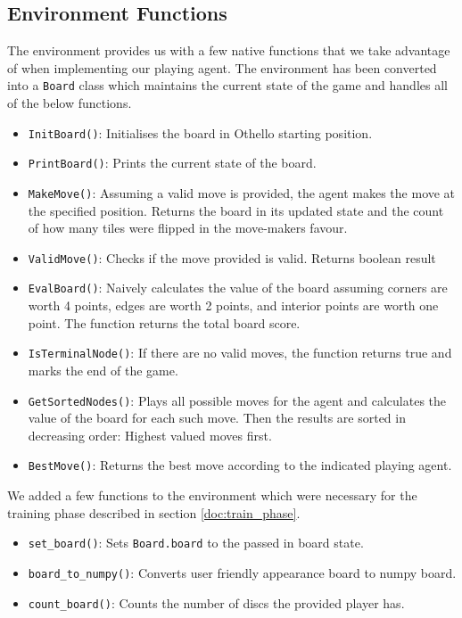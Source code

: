 \documentclass{article}
\begin{document}
\subsection{\label{doc:env_func}Environment Functions}
The environment provides us with a few native functions that we take advantage of when implementing our playing agent\cite{codes}. The environment has been converted into a \texttt{Board} class which maintains the current state of the game and handles all of the below functions.
\begin{itemize}
    \item \texttt{InitBoard()}: Initialises the board in Othello starting position.
    \item \texttt{PrintBoard()}: Prints the current state of the board.
    \item \texttt{MakeMove()}: Assuming a valid move is provided, the agent makes the move at the specified position. Returns the board in its updated state and the count of how many tiles were flipped in the move-makers favour.
    \item \texttt{ValidMove()}: Checks if the move provided is valid. Returns boolean result
    \item \texttt{EvalBoard()}: Naively calculates the value of the board assuming corners are worth 4 points, edges are worth 2 points, and interior points are worth one point. The function returns the total board score.
    \item \texttt{IsTerminalNode()}: If there are no valid moves, the function returns true and marks the end of the game.
    \item \texttt{GetSortedNodes()}: Plays all possible moves for the agent and calculates the value of the board for each such move. Then the results are sorted in decreasing order: Highest valued moves first.
    \item \texttt{BestMove()}: Returns the best move according to the indicated playing agent.
\end{itemize}
We added a few functions to the environment which were necessary for the training phase described in section \ref{doc:train_phase}.
\begin{itemize}
    \item \texttt{set\_board()}: Sets \texttt{Board.board} to the passed in board state.
    \item \texttt{board\_to\_numpy()}: Converts user friendly appearance board to numpy board.
    \item \texttt{count\_board()}: Counts the number of discs the provided player has.
\end{itemize}
\end{document}
